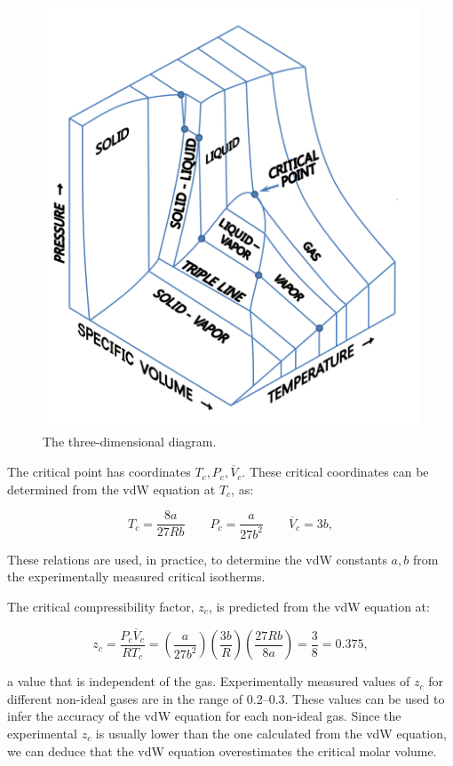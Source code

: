 \documentclass[
  9pt,
]{extbook}
\theoremstyle{definition}
\theoremstyle{definition}
\theoremstyle{definition}
\theoremstyle{remark}
\begin{document}
\begin{figure}

{\centering \includegraphics[width=0.5\linewidth]{./img/PVT_3D_diagram} 

}

\caption{The three-dimensional diagram.}\label{fig:FigTPVd}
\end{figure}

The critical point has coordinates \({T_c,P_c, \overline{V}_c}\). These critical coordinates can be determined from the vdW equation at \(T_c\), as:

\begin{equation}
T_c=\frac{8a}{27Rb} \qquad P_c=\frac{a}{27b^2} \qquad \overline{V}_c=3b, 
\label{eq:criticpt}
\end{equation}

These relations are used, in practice, to determine the vdW constants \(a,b\) from the experimentally measured critical isotherms.

The critical compressibility factor, \(z_c\), is predicted from the vdW equation at:

\begin{equation}
z_c=\frac{P_c \overline{V}_c}{R T_c}=\left( \frac{a}{27b^2} \right) \left( \frac{3b}{R} \right) \left( \frac{27Rb}{8a} \right) = \frac{3}{8} = 0.375,
\label{eq:critiz}
\end{equation}

a value that is independent of the gas. Experimentally measured values of \(z_c\) for different non-ideal gases are in the range of 0.2--0.3. These values can be used to infer the accuracy of the vdW equation for each non-ideal gas. Since the experimental \(z_c\) is usually lower than the one calculated from the vdW equation, we can deduce that the vdW equation overestimates the critical molar volume.
\end{document}
